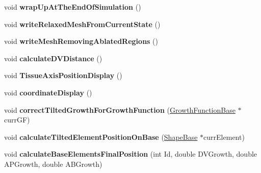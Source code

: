 \begin{DoxyCompactItemize}
\item 
\hypertarget{classSimulation_ada1776f97a899b0e77e20df658713cb3}{}void {\bfseries wrap\+Up\+At\+The\+End\+Of\+Simulation} ()\label{classSimulation_ada1776f97a899b0e77e20df658713cb3}

\item 
\hypertarget{classSimulation_ac6cb6f4e1f7060527ead71c2ce83727d}{}void {\bfseries write\+Relaxed\+Mesh\+From\+Current\+State} ()\label{classSimulation_ac6cb6f4e1f7060527ead71c2ce83727d}

\item 
\hypertarget{classSimulation_a1e990cd49b78fbe08f5e594c71872ac4}{}void {\bfseries write\+Mesh\+Removing\+Ablated\+Regions} ()\label{classSimulation_a1e990cd49b78fbe08f5e594c71872ac4}

\item 
\hypertarget{classSimulation_a2cdf77d01390a32cabb8ba7535a9f7dd}{}void {\bfseries calculate\+D\+V\+Distance} ()\label{classSimulation_a2cdf77d01390a32cabb8ba7535a9f7dd}

\item 
\hypertarget{classSimulation_abb87948e7b8131fd5d747bf728232db2}{}void {\bfseries Tissue\+Axis\+Position\+Display} ()\label{classSimulation_abb87948e7b8131fd5d747bf728232db2}

\item 
\hypertarget{classSimulation_a1d49a9ab3e83456d86ec5bfcf0d1a804}{}void {\bfseries coordinate\+Display} ()\label{classSimulation_a1d49a9ab3e83456d86ec5bfcf0d1a804}

\item 
\hypertarget{classSimulation_a3b25df63c54a058e6917309aed483e6e}{}void {\bfseries correct\+Tilted\+Growth\+For\+Growth\+Function} (\hyperlink{classGrowthFunctionBase}{Growth\+Function\+Base} $\ast$curr\+G\+F)\label{classSimulation_a3b25df63c54a058e6917309aed483e6e}

\item 
\hypertarget{classSimulation_acbe2603b1eb8b50978f9f1d30f87311c}{}void {\bfseries calculate\+Tilted\+Element\+Position\+On\+Base} (\hyperlink{classShapeBase}{Shape\+Base} $\ast$curr\+Element)\label{classSimulation_acbe2603b1eb8b50978f9f1d30f87311c}

\item 
\hypertarget{classSimulation_aa6e3525243aaf17afe95dc5bd97a124a}{}void {\bfseries calculate\+Base\+Elements\+Final\+Position} (int Id, double D\+V\+Growth, double A\+P\+Growth, double A\+B\+Growth)\label{classSimulation_aa6e3525243aaf17afe95dc5bd97a124a}


\end{DoxyCompactItemize}
